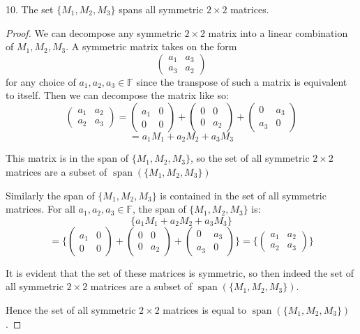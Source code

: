 \documentclass[11pt]{article}
\newcommand{\br}[1]{\left(#1\right)}
\newcommand{\cbr}[1]{\{#1\}}
\DeclareMathOperator{\Span}{span}
\begin{document}
10. The set $\cbr{M_1,M_2,M_3}$ spans all symmetric $2\times 2$ matrices.
\begin{proof}
    We can decompose any symmetric $2\times 2$ matrix into a linear combination of $M_1,M_2,M_3$. A symmetric matrix takes on the form $$\begin{pmatrix}
        a_1 & a_3 \\
        a_3 & a_2
    \end{pmatrix}$$ for any choice of $a_1,a_2,a_3\in\mathbb{F}$ since the transpose of such a matrix is equivalent to itself. Then we can decompose the matrix like so:
    $$\begin{pmatrix}
        a_1 & a_2 \\
        a_2 & a_3
    \end{pmatrix} = \begin{pmatrix}
        a_1 & 0 \\
        0 & 0
    \end{pmatrix} + \begin{pmatrix}
        0 & 0 \\
        0 & a_2
    \end{pmatrix} + \begin{pmatrix}
        0 & a_3 \\
        a_3 & 0
    \end{pmatrix}$$
    $$ = a_1M_1 + a_2M_2 + a_3M_3$$

    This matrix is in the span of $\cbr{M_1,M_2,M_3}$, so the set of all symmetric $2\times 2$ matrices are a subset of $\Span\br{\cbr{M_1,M_2,M_3}}$

    Similarly the span of $\cbr{M_1,M_2,M_3}$ is contained in the set of all symmetric matrices. For all $a_1,a_2,a_3\in\mathbb{F}$, the span of $\cbr{M_1,M_2,M_3}$ is:
    $$\cbr{a_1M_1 + a_2M_2 + a_3M_3}$$
    $$ = \cbr{\begin{pmatrix}
        a_1 & 0 \\
        0 & 0
    \end{pmatrix} + \begin{pmatrix}
        0 & 0 \\
        0 & a_2
    \end{pmatrix} + \begin{pmatrix}
        0 & a_3 \\
        a_3 & 0
    \end{pmatrix}} = \cbr{\begin{pmatrix}
        a_1 & a_2 \\
        a_2 & a_3
    \end{pmatrix}}$$

    It is evident that the set of these matrices is symmetric, so then indeed the set of all symmetric $2\times 2$ matrices are a subset of $\Span\br{\cbr{M_1,M_2,M_3}}$.

    Hence the set of all symmetric $2\times 2$ matrices is equal to $\Span\br{\cbr{M_1,M_2,M_3}}$.

\end{proof}
\end{document}
